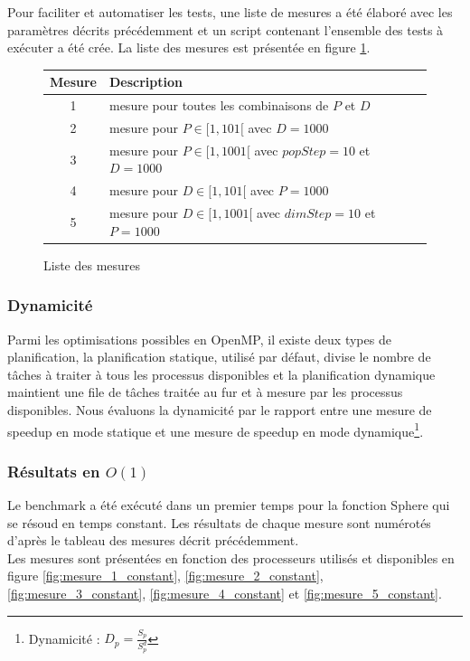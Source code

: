 Pour faciliter et automatiser les tests, une liste de mesures a été élaboré avec les paramètres décrits précédemment et un script contenant l'ensemble des tests à exécuter a été crée. La liste des mesures est présentée en figure \ref{fig:liste_mesures}.

\begin{figure}[here]
  \centering
  \begin{tabular}{ | c | l | }
    \hline
    \textbf{Mesure} & \textbf{Description}\\\hline
    1 & mesure pour toutes les combinaisons de $P$ et $D$\\\hline
    2 & mesure pour $P \in [1, 101[$ avec $D = 1000$\\\hline
    3 & mesure pour $P \in [1, 1001[$ avec $popStep = 10$ et $D = 1000$\\\hline
    4 & mesure pour $D \in [1, 101[$ avec $P = 1000$\\\hline
    5 & mesure pour $D \in [1, 1001[$ avec $dimStep = 10$ et $P = 1000$\\\hline
  \end{tabular}
  \caption{Liste des mesures}
  \label{fig:liste_mesures}
\end{figure}

\subsubsection{Dynamicité}

Parmi les optimisations possibles en OpenMP, il existe deux types de planification, la planification statique, utilisé par défaut, divise le nombre de tâches à traiter à tous les processus disponibles et la planification dynamique maintient une file de tâches traitée au fur et à mesure par les processus disponibles. Nous évaluons la dynamicité par le rapport entre une mesure de speedup en mode statique et une mesure de speedup en mode dynamique\footnote{Dynamicité : $D_p = \frac{S_p}{S_p^d}$}.

\subsubsection{Résultats en $O(1)$}

Le benchmark a été exécuté dans un premier temps pour la fonction Sphere qui se résoud en temps constant. Les résultats de chaque mesure sont numérotés d'après le tableau des mesures décrit précédemment.\\

Les mesures sont présentées en fonction des processeurs utilisés et disponibles en figure \ref{fig:mesure_1_constant}, \ref{fig:mesure_2_constant}, \ref{fig:mesure_3_constant}, \ref{fig:mesure_4_constant} et \ref{fig:mesure_5_constant}.

